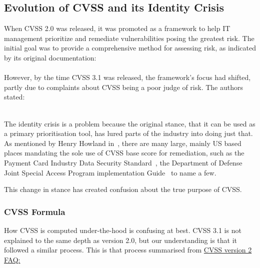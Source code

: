 \documentclass[12pt]{article}
\begin{document}
\subsection{Evolution of CVSS and its Identity Crisis}
When CVSS 2.0 was released, it was promoted as a framework to help IT management prioritize and
remediate vulnerabilities posing the greatest risk. The initial goal was to provide a comprehensive
method for assessing risk, as indicated by its original documentation:
\\

\textit{}~\cite{CVSS_2}
\\

However, by the time CVSS 3.1 was released, the framework's focus had shifted, partly due to
complaints about CVSS being a poor judge of risk. The authors stated:

\textit{}~\cite{CVSS_31}
\\

The identity crisis is a problem because the original stance, that it can be used as a primary
prioritisation tool, has lured parts of the industry into doing just that. As mentioned by Henry
Howland in~\cite{ubiquitous}, there are many large, mainly US based places mandating the sole use of
CVSS base score for remediation, such as the Payment Card Industry Data Security Standard~\cite{PCI}, the
Department of Defense Joint Special Access Program implementation Guide~\cite{DOD} to name a few.

This change in stance has created confusion about the true purpose of CVSS.

\subsubsection{CVSS Formula}


How CVSS is computed under-the-hood is confusing at best. CVSS 3.1 is not explained to the same
depth as version 2.0, but our understanding is that it followed a similar process. This is that
process summarised from
\href{https://www.first.org/cvss/v2/faq#Explanation-of-CVSS-v2-formula-and-metric-valued-development}{CVSS
	version 2 FAQ:}~\cite{CVSS_formula}
\end{document}
